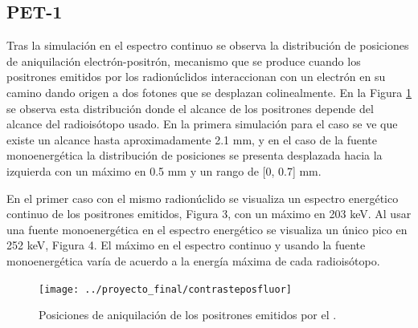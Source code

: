\documentclass[12pt,a4paper,onecolumn]{article}
\begin{document}
\subsection*{PET-1}
Tras la simulación en el espectro continuo se observa la distribución de posiciones de aniquilación electrón-positrón, mecanismo que se produce cuando los positrones emitidos por los radionúclidos interaccionan con un electrón en su camino dando origen a dos fotones que se desplazan colinealmente. En la Figura \ref{fig:contrasteposfluor} se observa esta distribución donde el alcance de los positrones depende del alcance del radioisótopo usado. En la primera simulación para el caso   se ve que existe un alcance hasta aproximadamente 2.1 mm, y en el caso de la fuente monoenergética la distribución de posiciones se presenta desplazada hacia la izquierda con un máximo en 0.5 mm y un rango de [0, 0.7] mm.

En el primer caso con el mismo radionúclido se visualiza un espectro energético continuo de los positrones emitidos, Figura 3, con un máximo en 203 keV. Al usar una fuente monoenergética en el espectro energético se visualiza un único pico en 252 keV, Figura 4. El máximo en el espectro continuo y usando la fuente monoenergética varía de acuerdo a la energía máxima de cada radioisótopo.
\begin{figure}[h]
	\centering
	\texttt{[image: ../proyecto\_final/contrasteposfluor]}
	\caption{Posiciones de aniquilación de los positrones emitidos por el .}
	\label{fig:contrasteposfluor}
\end{figure}
\end{document}
